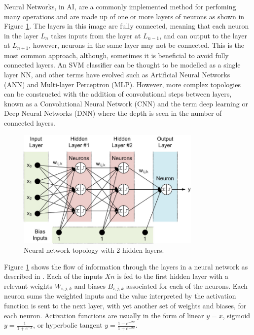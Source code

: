 \documentclass[fleqn,twoside]{article}
\begin{document}
Neural Networks, in AI, are a commonly implemented method for perfoming many operations and are made up of one or more layers of neurons as shown in Figure \ref{fig:neural_net}. The layers in this image are fully connected, meaning that each neuron in the layer $L_n$ takes inputs from the layer at $L_{n-1}$, and can output to the layer at $L_{n+1}$, however, neurons in the same layer may not be connected. This is the most common approach, although, sometimes it is beneficial to avoid fully connected layers. An SVM classifier can be thought to be modelled as a single layer NN, and other terms have evolved such as Artificial Neural Networks (ANN) and Multi-layer Perceptron (MLP). However, more complex topologies can be constructed with the addition of convolutional steps between layers, known as a Convolutional Neural Network (CNN) and the term deep learning or Deep Neural Networks (DNN) where the depth is seen in the number of connected layers.  

\begin{figure}[h]
	\centering
	\includegraphics[width=0.8\textwidth]{neural_net.jpeg}
	\caption{Neural network topology with 2 hidden layers.}
	\label{fig:neural_net}
\end{figure}

Figure \ref{fig:neural_net} shows the flow of information through the layers in a neural network as described in \cite{smith}. Each of the inputs $Xn$ is fed to the first hidden layer with a relevant weights $W_{i,j,k}$ and biases $B_{i,j,k}$ associated for each of the neurons. Each neuron sums the weighted inputs and the value interpreted by the activation function is sent to the next layer, with yet another set of weights and biases, for each neuron. Activation functions are usually in the form of linear $y=x$, sigmoid $y=\frac{1}{1+e^{-x}}$, or hyperbolic tangent $y=\frac{1-e^{-2x}}{1+e^{-2x}}$.
\end{document}

